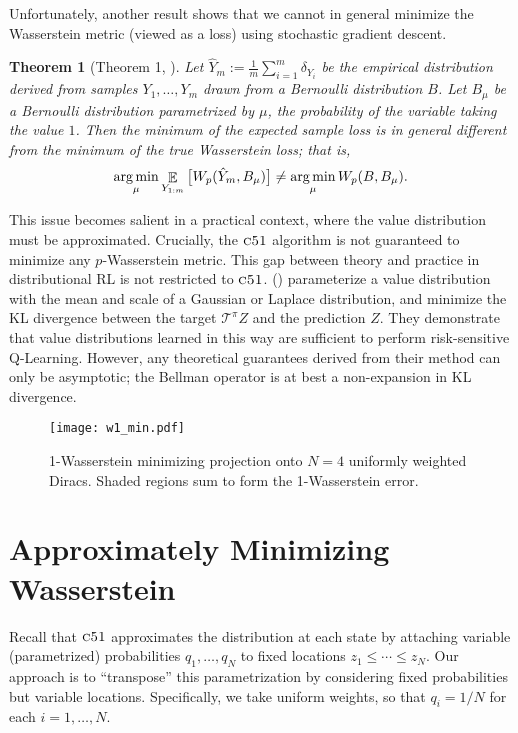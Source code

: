 \documentclass[letterpaper]{article}
\newcommand{\cT}{\mathcal{T}}
\DeclareMathOperator*{\expect}{{\huge \mathbb{E}}}
\newtheorem{thm}{Theorem}
\DeclareMathOperator*{\argmin}{arg\,min}
\def \cfo {\textsc{c51}}
\def \cTpi {\cT^\pi}
\newcommand{\citet}[1]{\citeauthor{#1} (\citeyear{#1})}
\begin{document}
Unfortunately, another result shows that we cannot in general minimize the Wasserstein metric (viewed as a loss) using stochastic gradient descent.
\begin{thm}[Theorem 1, \citeauthor{bellemare17cramer} \citeyear{bellemare17cramer}]\label{thm:biased_gradients}
Let $\hat{Y}_m := \tfrac{1}{m} \sum_{i=1}^m \delta_{Y_i}$ be the empirical distribution derived from samples $Y_1, \dots, Y_m$ drawn from a Bernoulli distribution $B$. Let $B_\mu$ be a Bernoulli distribution parametrized by $\mu$, the probability of the variable taking the value $1$. Then the minimum of the expected sample loss is in general different from the minimum of the true Wasserstein loss; that is,
\begin{equation*}
    \argmin_\mu \expect_{Y_{1:m}} \big [ W_p(\hat Y_m, B_\mu) \big ] \ne \argmin_\mu W_p(B , B_\mu) .
\end{equation*}
\end{thm}
This issue becomes salient in a practical context, where the value distribution must be approximated. Crucially, the $\cfo$ algorithm is not guaranteed to minimize any $p$-Wasserstein metric. This gap between theory and practice in distributional RL is not restricted to $\cfo$. \citet{morimura10parametric} parameterize a value distribution with the mean and scale of a Gaussian or Laplace distribution, and minimize the KL divergence between the target $\cTpi Z$ and the prediction $Z$. They demonstrate that value distributions learned in this way are sufficient to perform risk-sensitive Q-Learning. However, any theoretical guarantees derived from their method can only be asymptotic; the Bellman operator is at best a non-expansion in KL divergence.

\begin{figure}[t]
\begin{center}
\texttt{[image: w1\_min.pdf]}
\end{center}
\caption{1-Wasserstein minimizing projection onto $N=4$ uniformly weighted Diracs. Shaded regions sum to form the 1-Wasserstein error.\label{fig:wmin}}
\end{figure}


\section{Approximately Minimizing Wasserstein}
Recall that $\cfo$ approximates the distribution at each state by attaching variable (parametrized) probabilities $q_1, \dots, q_N$ to fixed locations $z_1 \leq \cdots \leq z_N$. Our approach is to ``transpose'' this parametrization by considering fixed probabilities but variable locations. 
Specifically, we take uniform weights, so that $q_i = 1/N$ for each $i=1,\ldots, N$.
\end{document}
